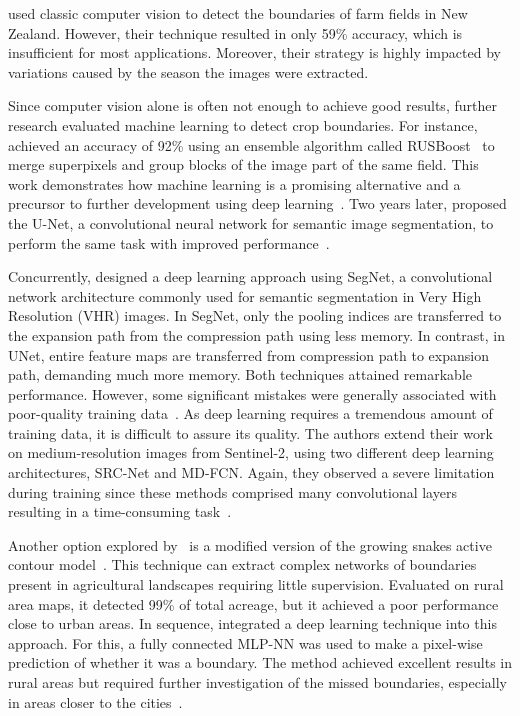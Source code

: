 \documentclass[12pt]{article}
\begin{document}
\citet{north2019} used classic computer vision to detect the boundaries of farm fields in New Zealand. However, their technique resulted in only 59\% accuracy, which is insufficient for most applications. Moreover, their strategy is highly impacted by variations caused by the season the images were extracted.


Since computer vision alone is often not enough to achieve good results, further research evaluated machine learning to detect crop boundaries. For instance, \citet{garcia2017} achieved an accuracy of 92\% using an ensemble algorithm called RUSBoost~\citep{seiffert2010} to merge superpixels and group blocks of the image part of the same field. This work demonstrates how machine learning is a promising alternative and a precursor to further development using deep learning~\citep{garcia2017}. Two years later, \citet{garcia2019} proposed the U-Net, a convolutional neural network for semantic image segmentation, to perform the same task with improved performance~\cite{garcia2017,garcia2018,garcia2019}.

Concurrently, \citet{persello2019} designed a deep learning approach using SegNet, a convolutional network architecture commonly used for semantic segmentation in Very High Resolution (VHR) images. In SegNet, only the pooling indices are transferred to the expansion path from the compression path using less memory. In contrast, in UNet, entire feature maps are transferred from compression path to expansion path, demanding much more memory. Both techniques attained remarkable performance. However, some significant mistakes were generally associated with poor-quality training data~\citep{persello2019}. As deep learning requires a tremendous amount of training data, it is difficult to assure its quality. The authors extend their work on medium-resolution images from Sentinel-2, using two different deep learning architectures, SRC-Net and MD-FCN. Again, they observed a severe limitation during training since these methods comprised many convolutional layers resulting in a time-consuming task~\cite{persello2019,masoud2020}.

Another option explored by~\citet{wagner2020} is a modified version of the growing snakes active contour model~\cite{wagner2020}. This technique can extract complex networks of boundaries present in agricultural landscapes requiring little supervision. Evaluated on rural area maps, it detected 99\% of total acreage, but it achieved a poor performance close to urban areas. In sequence, \citet{wagner2020.2} integrated a deep learning technique into this approach. For this, a fully connected MLP-NN was used to make a pixel-wise prediction of whether it was a boundary. The method achieved excellent results in rural areas but required further investigation of the missed boundaries, especially in areas closer to the cities~\cite{wagner2020.2,wagner2020}.
\end{document}
